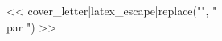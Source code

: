 \documentclass[11pt]{article}
\begin{document}
<< cover_letter|latex_escape|replace("\n", "\\par ") >>
\end{document}

